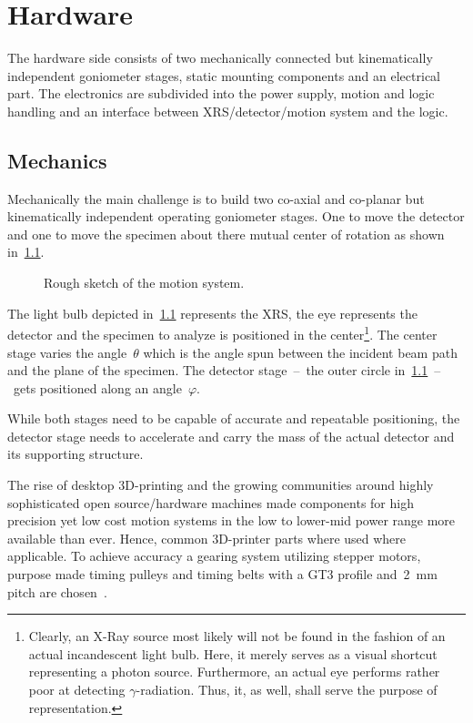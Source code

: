 \chapter{Hardware}
    The hardware side consists of two mechanically connected but kinematically independent goniometer stages, static mounting components and an electrical part.
    The electronics are subdivided into the power supply, motion and logic handling and an interface between XRS/detector/motion system and the logic.

    \section{Mechanics}
        Mechanically the main challenge is to build two co-axial and co-planar but kinematically independent operating goniometer stages.
        One to move the detector and one to move the specimen about there mutual center of rotation as shown in~\cref{fig:rough sketch of the motion system}.
        \begin{figure}[h]
            \centering
            \caption[Rough sketch of the motion system.]{Rough sketch of the motion system.}%
            \label{fig:rough sketch of the motion system}%
        \end{figure}
        The light bulb depicted in~\cref{fig:rough sketch of the motion system} represents the XRS, the eye represents the detector and the specimen to analyze is positioned in the center\footnote{Clearly, an X-Ray source most likely will not be found in the fashion of an actual incandescent light bulb. Here, it merely serves as a visual shortcut representing a photon source. Furthermore, an actual eye performs rather poor at detecting \(\gamma\)-radiation. Thus, it, as well, shall serve the purpose of representation.}.
        The center stage varies the angle~\(\theta\) which is the angle spun between the incident beam path and the plane of the specimen.
        The detector stage~--~the outer circle in~\cref{fig:rough sketch of the motion system}~--~gets positioned along an angle~\(\varphi\).\par\medskip

        While both stages need to be capable of accurate and repeatable positioning, the detector stage needs to accelerate and carry the mass of the actual detector and its supporting structure.

        The rise of desktop 3D-printing and the growing communities around highly sophisticated open source/hardware machines made components for high precision yet low cost motion systems in the low to lower-mid power range more available than ever.
        Hence, common 3D-printer parts where used where applicable.
        To achieve accuracy a gearing system utilizing stepper motors, purpose made timing pulleys and timing belts with a GT3 profile and~\qty{2}{\milli\metre} pitch are chosen~\cite{Manual.POWERGRIPGT3,Manual.LIGHTPOWERPRECISION}.
        
